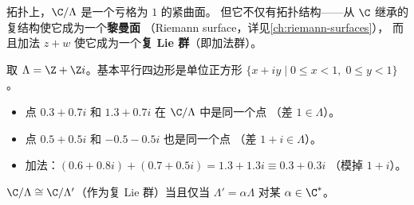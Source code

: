 拓扑上，$\C/\Lambda$ 是一个亏格为 $1$ 的紧曲面。
但它不仅有拓扑结构——从 $\C$ 继承的复结构使它成为一个\textbf{黎曼面}
（Riemann surface，详见\cref{ch:riemann-surfaces}），
而且加法 $z + w$ 使它成为一个\textbf{复 Lie 群}（即加法群）。

\begin{example}[格 $\Z + \Z i$ 对应的环面]
\label{ex:square-torus}
取 $\Lambda = \Z + \Z i$。基本平行四边形是单位正方形
$\{x + iy \mid 0 \leq x < 1,\; 0 \leq y < 1\}$。
\begin{itemize}
  \item 点 $0.3 + 0.7i$ 和 $1.3 + 0.7i$ 在 $\C/\Lambda$ 中是同一个点
    （差 $1 \in \Lambda$）。
  \item 点 $0.5 + 0.5i$ 和 $-0.5 - 0.5i$ 也是同一个点
    （差 $1 + i \in \Lambda$）。
  \item 加法：$(0.6 + 0.8i) + (0.7 + 0.5i) = 1.3 + 1.3i \equiv 0.3 + 0.3i$
    （模掉 $1 + i$）。
\end{itemize}
\end{example}

\begin{proposition}[复环面的同构分类]
\label{prop:torus-isomorphism}
$\C/\Lambda \cong \C/\Lambda'$（作为复 Lie 群）当且仅当
$\Lambda' = \alpha\Lambda$ 对某 $\alpha \in \C^*$。
\end{proposition}


